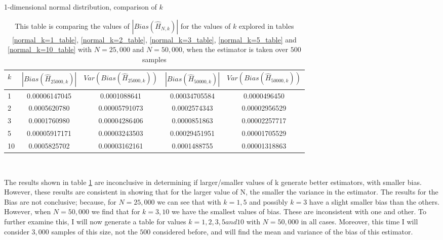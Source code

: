 \documentclass{article}
\begin{document}
\begin{table}
\caption{1-dimensional normal distribution, comparison of $k$} \label{normal_kcompare_table}
\begin{center}
\begin{tabular}{| l | c c c c|} 
\toprule
$k$ & $|Bias(\hat{H}_{25000, k})|$ & $Var(Bias(\hat{H}_{25000, k}))$ & $|Bias(\hat{H}_{50000, k})|$ & $Var(Bias(\hat{H}_{50000, k}) )$ \\
\midrule[1pt]
1    & 0.00006147045   & 0.0001088641     & 0.00034705584   & 0.0000496450   \\
2    & 0.0005620780     & 0.00005791073   & 0.0002574343     & 0.00002956529 \\
3    & 0.0001760980     & 0.00004286406   & 0.0000851863     & 0.00002257717 \\
5    & 0.00005917171   & 0.00003243503   & 0.00029451951   & 0.00001705529 \\
10  & 0.0005825702     & 0.00003162161   & 0.0001488755     & 0.00001318863 \\
\hline
\end{tabular}
\\[10pt]
\caption*{This table is comparing the values of $|Bias(\hat{H}_{N, k})|$ for the values of $k$ explored in tables \ref{normal_k=1_table}, \ref{normal_k=2_table}, \ref{normal_k=3_table}, \ref{normal_k=5_table} and  \ref{normal_k=10_table} with $N=25,000$ and $N=50,000$, when the estimator is taken over $500$ samples}
\end{center}
\end{table}

The results shown in table \ref{normal_kcompare_table} are inconclusive in determining if larger/smaller values of k generate better estimators, with smaller bias. However, these results are consistent in showing that for the larger value of N, the smaller the variance in the estimator. The results for the Bias are not conclusive; because, for $N=25,000$ we can see that with $k=1, 5$ and possibly $k=3$ have a slight smaller bias than the others. However, when $N=50,000$ we find that for $k=3, 10$ we have the smallest values of bias. These are inconsistent with one and other. To further examine this, I will now generate a table for values $k=1, 2, 3, 5 and 10$ with $N=50,000$ in all cases. Moreover, this time I will consider $3,000$ samples of this size, not the $500$ considered before, and will find the mean and variance of the bias of this estimator.
\end{document}
